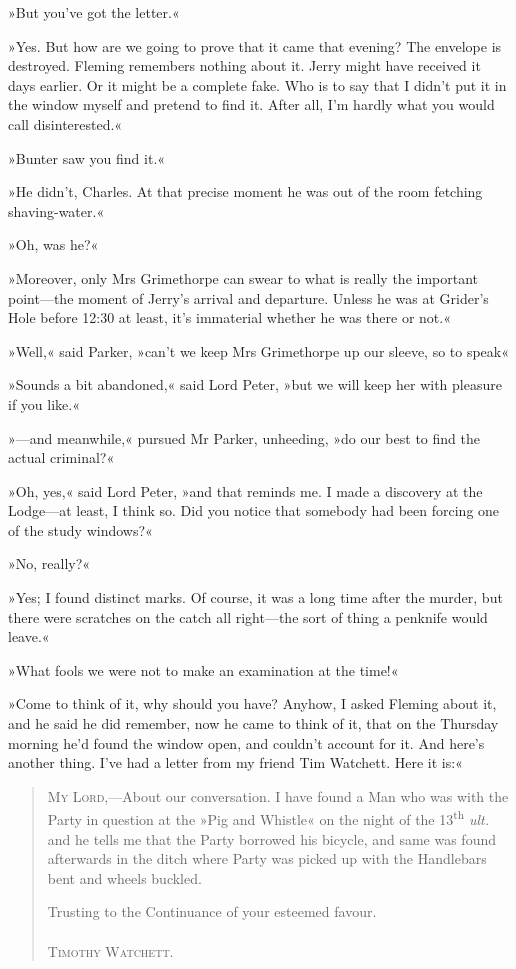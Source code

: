 »But you've got the letter.«

»Yes. But how are we going to prove that it came that evening? The envelope is destroyed. Fleming remembers nothing about it. Jerry might have received it days earlier. Or it might be a complete fake. Who is to say that I didn't put it in the window myself and pretend to find it. After all, I'm hardly what you would call disinterested.«

»Bunter saw you find it.«

»He didn't, Charles. At that precise moment he was out of the room fetching shaving-water.«

»Oh, was he?«

»Moreover, only Mrs Grimethorpe can swear to what is really the important point—the moment of Jerry's arrival and departure. Unless he was at Grider's Hole before 12:30 at least, it's immaterial whether he was there or not.«

»Well,« said Parker, »can't we keep Mrs Grimethorpe up our sleeve, so to speak\longdash«

»Sounds a bit abandoned,« said Lord Peter, »but we will keep her with pleasure if you like.«

»—and meanwhile,« pursued Mr Parker, unheeding, »do our best to find the actual criminal?«

»Oh, yes,« said Lord Peter, »and that reminds me. I made a discovery at the Lodge—at least, I think so. Did you notice that somebody had been forcing one of the study windows?«

»No, really?«

»Yes; I found distinct marks. Of course, it was a long time after the murder, but there were scratches on the catch all right—the sort of thing a penknife would leave.«

»What fools we were not to make an examination at the time!«

»Come to think of it, why should you have? Anyhow, I asked Fleming about it, and he said he did remember, now he came to think of it, that on the Thursday morning he'd found the window open, and couldn't account for it. And here's another thing. I've had a letter from my friend Tim Watchett. Here it is:«

\begin{quote}
\textsc{My Lord},—About our conversation. I have found a Man who was with the Party in question at the »Pig and Whistle« on the night of the 13\textsuperscript{th} \textit{ult.} and he tells me that the Party borrowed his bicycle, and same was found afterwards in the ditch where Party was picked up with the Handlebars bent and wheels buckled.

\begin{flushright}
\begin{minipage}{.5\textwidth}
Trusting to the Continuance of your esteemed favour.\\
~\\
\textsc{Timothy Watchett.}
\end{minipage}
\end{flushright}
\end{quote}

